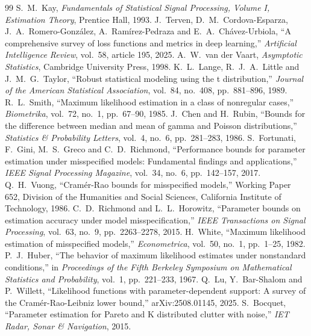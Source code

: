 \documentclass[11pt]{article}
\numberwithin{figure}{section}
\numberwithin{equation}{section}
\begin{document}
\clearpage
{}
\begin{thebibliography}{99}
 S.~M.~Kay, \emph{Fundamentals of Statistical Signal Processing, Volume I,
  Estimation Theory}, Prentice Hall, 1993.
 J.~Terven, D.~M.~Cordova-Esparza, J.~A.~Romero-Gonz\'alez, A.~Ram\'irez-Pedraza
  and E.~A.~Ch\'avez-Urbiola, ``A comprehensive survey of loss functions and metrics in deep
  learning,'' \emph{Artificial Intelligence Review}, vol.~58, article 195, 2025.
 A.~W.~van der Vaart, \emph{Asymptotic Statistics}, Cambridge University Press,
  1998.
 K.~L.~Lange, R.~J.~A.~Little and J.~M.~G.~Taylor, ``Robust statistical modeling
  using the t distribution,'' \emph{Journal of the American Statistical Association}, vol.~84,
  no.~408, pp.~881--896, 1989.
 R.~L.~Smith, ``Maximum likelihood estimation in a class of nonregular cases,''
  \emph{Biometrika}, vol.~72, no.~1, pp.~67--90, 1985.
 J.~Chen and H.~Rubin, ``Bounds for the difference between median and mean of
  gamma and Poisson distributions,'' \emph{Statistics \& Probability Letters}, vol.~4, no.~6,
  pp.~281--283, 1986.
 S.~Fortunati, F.~Gini, M.~S.~Greco and C.~D.~Richmond, ``Performance bounds
  for parameter estimation under misspecified models: Fundamental findings and applications,''
  \emph{IEEE Signal Processing Magazine}, vol.~34, no.~6, pp.~142--157, 2017.
 Q.~H.~Vuong, ``Cram\'er-Rao bounds for misspecified models,'' Working Paper 652,
  Division of the Humanities and Social Sciences, California Institute of Technology, 1986.
 C.~D.~Richmond and L.~L.~Horowitz, ``Parameter bounds on estimation accuracy
  under model misspecification,'' \emph{IEEE Transactions on Signal Processing}, vol.~63, no.~9,
  pp.~2263--2278, 2015.
 H.~White, ``Maximum likelihood estimation of misspecified models,''
  \emph{Econometrica}, vol.~50, no.~1, pp.~1--25, 1982.
 P.~J.~Huber, ``The behavior of maximum likelihood estimates under nonstandard
  conditions,'' in \emph{Proceedings of the Fifth Berkeley Symposium on Mathematical Statistics and
  Probability}, vol.~1, pp.~221--233, 1967.
 Q.~Lu, Y.~Bar-Shalom and P.~Willett, ``Likelihood functions with
  parameter-dependent support: A survey of the Cram\'er-Rao-Leibniz lower bound,'' arXiv:2508.01145,
  2025.
 S.~Bocquet, ``Parameter estimation for Pareto and K distributed clutter with
  noise,'' \emph{IET Radar, Sonar \& Navigation}, 2015.

\end{thebibliography}
\end{document}
